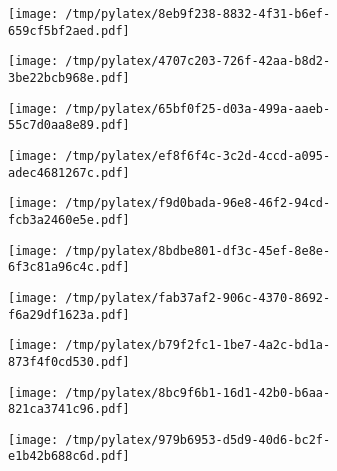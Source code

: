 \documentclass{article}
\begin{document}
\begin{figure}[htbp]
\begin{subfigure}[b]{.3\linewidth}
\texttt{[image: /tmp/pylatex/8eb9f238-8832-4f31-b6ef-659cf5bf2aed.pdf]}
\end{subfigure}
\begin{subfigure}[b]{.3\linewidth}
\texttt{[image: /tmp/pylatex/4707c203-726f-42aa-b8d2-3be22bcb968e.pdf]}
\end{subfigure}
\begin{subfigure}[b]{.3\linewidth}
\texttt{[image: /tmp/pylatex/65bf0f25-d03a-499a-aaeb-55c7d0aa8e89.pdf]}
\end{subfigure}
\begin{subfigure}[b]{.3\linewidth}
\texttt{[image: /tmp/pylatex/ef8f6f4c-3c2d-4ccd-a095-adec4681267c.pdf]}
\end{subfigure}
\begin{subfigure}[b]{.3\linewidth}
\texttt{[image: /tmp/pylatex/f9d0bada-96e8-46f2-94cd-fcb3a2460e5e.pdf]}
\end{subfigure}
\begin{subfigure}[b]{.3\linewidth}
\texttt{[image: /tmp/pylatex/8bdbe801-df3c-45ef-8e8e-6f3c81a96c4c.pdf]}
\end{subfigure}
\begin{subfigure}[b]{.3\linewidth}
\texttt{[image: /tmp/pylatex/fab37af2-906c-4370-8692-f6a29df1623a.pdf]}
\end{subfigure}
\begin{subfigure}[b]{.3\linewidth}
\texttt{[image: /tmp/pylatex/b79f2fc1-1be7-4a2c-bd1a-873f4f0cd530.pdf]}
\end{subfigure}
\begin{subfigure}[b]{.3\linewidth}
\texttt{[image: /tmp/pylatex/8bc9f6b1-16d1-42b0-b6aa-821ca3741c96.pdf]}
\end{subfigure}
\begin{subfigure}[b]{.3\linewidth}
\texttt{[image: /tmp/pylatex/979b6953-d5d9-40d6-bc2f-e1b42b688c6d.pdf]}
\end{subfigure}
\end{figure}
\end{document}
